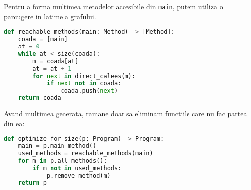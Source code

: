 Pentru a forma multimea metodelor accesibile din \texttt{main},
putem utiliza o parcugere in latime a grafului.

\begin{lstlisting}[language=Python]
def reachable_methods(main: Method) -> [Method]:
    coada = [main]
    at = 0
    while at < size(coada):
        m = coada[at]
        at = at + 1
        for next in direct_calees(m):
            if next not in coada:
                coada.push(next)
    return coada
\end{lstlisting}

Avand multimea generata, ramane doar sa eliminam functiile
care nu fac partea din ea:

\begin{lstlisting}[language=Python]
def optimize_for_size(p: Program) -> Program:
    main = p.main_method()
    used_methods = reachable_methods(main)
    for m in p.all_methods():
        if m not in used_methods:
            p.remove_method(m)
    return p
\end{lstlisting}

